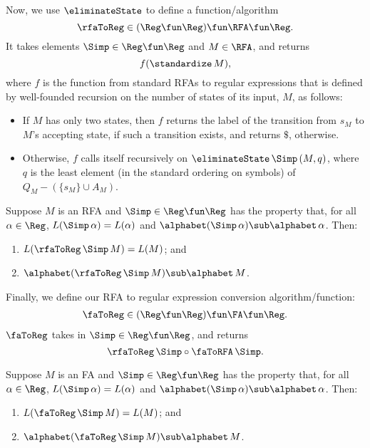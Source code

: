 Now, we use $\eliminateState$ to define a function/algorithm
\begin{displaymath}
  \rfaToReg \in (\Reg\fun\Reg) \fun \RFA \fun \Reg .
\end{displaymath}
It takes elements $\Simp\in\Reg\fun\Reg$ and $M\in\RFA$, and
returns
\begin{displaymath}
  f(\standardize\,M) ,
\end{displaymath}
where $f$ is the function from standard RFAs to regular expressions
that is defined by well-founded recursion on the number of states of
its input, $M$, as follows:
\begin{itemize}
\item If $M$ has only two states,  then $f$ returns the
  label of the transition from $s_M$ to $M$'s accepting state, if such
  a transition exists, and returns $\$$, otherwise.

\item Otherwise,  $f$ calls itself recursively on
  $\eliminateState\,\Simp\,(M,q)$, where $q$ is the least element (in the
  standard ordering on symbols) of $Q_M-(\{s_M\}\cup A_M)$.
\end{itemize}

\begin{proposition}
Suppose $M$ is an RFA and
$\Simp\in\Reg\fun\Reg$ has the property that,
for all $\alpha\in\Reg$, $L(\Simp\,\alpha) = L(\alpha)$ and
$\alphabet(\Simp\,\alpha)\sub\alphabet\,\alpha$.
Then:
\begin{enumerate}[\quad(1)]
\item $L(\rfaToReg\,\Simp\,M) = L(M)$; and 

\item $\alphabet(\rfaToReg\,\Simp\,M) \sub \alphabet\,M$.
\end{enumerate}
\end{proposition}

Finally, we define our RFA to regular expression conversion algorithm/function:
\begin{gather*}
\faToReg\in(\Reg\fun\Reg)\fun\FA\fun\Reg .  
\end{gather*}
$\faToReg$ takes in $\Simp\in\Reg\fun\Reg$, and returns
\begin{displaymath}
\rfaToReg\,\Simp \circ \faToRFA\,\Simp .
\end{displaymath}

\begin{proposition}
Suppose $M$ is an FA and
$\Simp\in\Reg\fun\Reg$ has the property that,
for all $\alpha\in\Reg$, $L(\Simp\,\alpha) = L(\alpha)$ and
$\alphabet(\Simp\,\alpha)\sub\alphabet\,\alpha$.
Then:
\begin{enumerate}[\quad(1)]
\item $L(\faToReg\,\Simp\,M) = L(M)$; and 

\item $\alphabet(\faToReg\,\Simp\,M) \sub \alphabet\,M$.
\end{enumerate}
\end{proposition}

